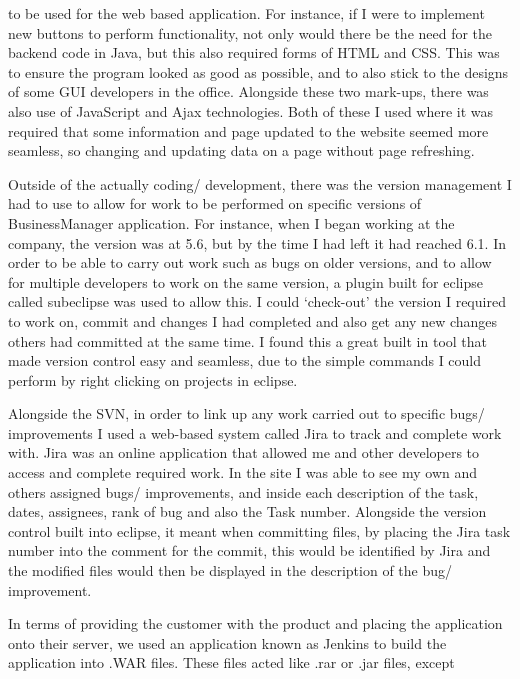 \documentclass[12pt]{article}
\begin{document}
to be used for the web based application. For instance, if I were to implement new buttons to perform functionality, not
only would there be the need for the backend code in Java, but this also required forms of HTML and CSS. This was to
ensure the program looked as good as possible, and to also stick to the designs of some GUI developers in the office.
Alongside these two mark-ups, there was also use of JavaScript and Ajax technologies. Both of these I used where it was
required that some information and page updated to the website seemed more seamless, so changing and updating data on a
page without page refreshing. \\ \par \noindent
Outside of the actually coding/ development, there was the version management I had to use to allow for work to be
performed on specific versions of BusinessManager application. For instance, when I began working at the company, the
version was at 5.6, but by the time I had left it had reached 6.1. In order to be able to carry out work such as bugs on
older versions, and to allow for multiple developers to work on the same version, a plugin built for eclipse called
subeclipse was used to allow this. I could ‘check-out’ the version I required to work on, commit and changes I had
completed and also get any new changes others had committed at the same time. I found this a great built in tool that
made version control easy and seamless, due to the simple commands I could perform by right clicking on projects in
eclipse.\\ \par \noindent
Alongside the SVN, in order to link up any work carried out to specific bugs/ improvements I used a web-based system
called Jira to track and complete work with. Jira was an online application that allowed me and other developers to
access and complete required work. In the site I was able to see my own and others assigned bugs/ improvements, and
inside each description of the task, dates, assignees, rank of bug and also the Task number. Alongside the version
control built into eclipse, it meant when committing files, by placing the Jira task number into the comment for the
commit, this would be identified by Jira and the modified files would then be displayed in the description of the bug/
improvement. \\ \par \noindent
In terms of providing the customer with the product and placing the application onto their server, we used an
application known as Jenkins to build the application into .WAR files. These files acted like .rar or .jar files, except
\end{document}
